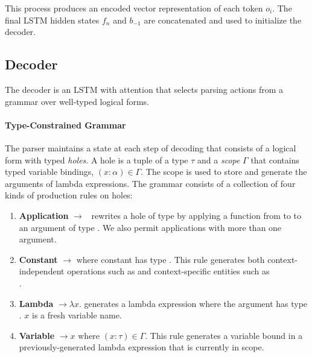 This process produces an encoded vector representation of each token $o_i$. The 
final LSTM hidden states $f_n$ and $b_{-1}$ are concatenated  and used to 
initialize the decoder.

\subsection{Decoder}
\label{sec:nnsp_decoder}

The decoder is an LSTM with attention that selects parsing actions from a 
grammar over well-typed logical forms.

\paragraph{Type-Constrained Grammar} The parser maintains a state at each step 
of decoding that consists of a logical form with typed \emph{holes}.
A hole is a tuple \hole{\tau}{\Gamma} of a type $\tau$ and a \emph{scope} 
$\Gamma$ that contains typed variable bindings, $(x:\alpha) \in \Gamma$.
The scope is used to store and generate the arguments of lambda expressions. 
The grammar consists of a collection of four kinds of production rules on holes:

\begin{enumerate}
    \item \textbf{Application} 
\hole{\tau}{\Gamma}$\rightarrow$\pred{(}\hole{\func{\beta}{\tau}}{\Gamma}~\hole{\beta}{\Gamma}\pred{)}
rewrites a hole of type \type{\tau} by applying a 
function from \type{\beta} to \type{\tau} to an argument of type \type{\beta}. 
We also permit applications with more than one argument.
    \item \textbf{Constant} \hole{\tau}{\Gamma}$\rightarrow$ where 
constant  has type \type{\tau}. This rule generates both 
context-independent operations such as  and context-specific 
entities such as\\
.
    \item \textbf{Lambda} \hole{\func{\alpha}{\tau}}{\Gamma}$\rightarrow 
\lambda x$.  generates a lambda 
expression where the argument has type \type{\alpha}. $x$ is a fresh variable 
name.
    \item \textbf{Variable} \hole{\tau}{\Gamma}$\rightarrow x$ where $(x : 
\tau) \in \Gamma$. This rule generates a variable bound in a 
previously-generated lambda expression that is currently in scope.
\end{enumerate}

